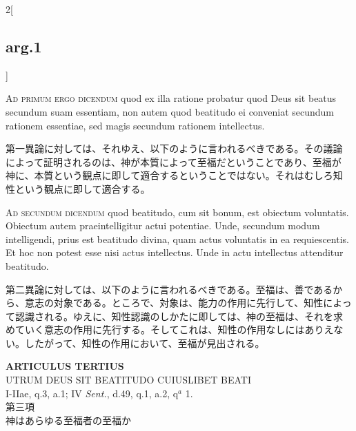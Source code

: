 \documentclass[paper=a4paper,fontsize=10pt,jafontsize=9pt,titlepage]{jlreq}
\begin{document}
\begin{paracol}{2}[\subsection{arg.1}]
\switchcolumn*[\subsection{ad.1}]

{\scshape Ad primum ergo dicendum} quod ex illa ratione probatur quod Deus sit
beatus secundum suam essentiam, non autem quod beatitudo ei conveniat
secundum rationem essentiae, sed magis secundum rationem intellectus.

\switchcolumn

第一異論に対しては、それゆえ、以下のように言われるべきである。その議論
によって証明されるのは、神が本質によって至福だということであり、至福が
神に、本質という観点に即して適合するということではない。それはむしろ知
性という観点に即して適合する。

\switchcolumn*[\subsection{ad.2}]

{\scshape Ad secundum dicendum} quod beatitudo, cum sit bonum, est
obiectum voluntatis. Obiectum autem praeintelligitur actui
potentiae. Unde, secundum modum intelligendi, prius est beatitudo
divina, quam actus voluntatis in ea requiescentis. Et hoc non potest
esse nisi actus intellectus. Unde in actu intellectus attenditur
beatitudo.

\switchcolumn

第二異論に対しては、以下のように言われるべきである。至福は、善であるか
ら、意志の対象である。ところで、対象は、能力の作用に先行して、知性によっ
て認識される。ゆえに、知性認識のしかたに即しては、神の至福は、それを求
めていく意志の作用に先行する。そしてこれは、知性の作用なしにはありえな
い。したがって、知性の作用において、至福が見出される。

\end{paracol}



\newpage
{}
{}
\setcounter{section}{3}
\setcounter{subsection}{0}


\begin{center}
 {\Large {\bfseries ARTICULUS TERTIUS}}\\
 {\large UTRUM DEUS SIT BEATITUDO CUIUSLIBET BEATI}\\
 {\footnotesize I-IIae, q.3, a.1; IV {\itshape Sent.}, d.49, q.1, a.2,
 q$^a$ 1.}\\
 {\Large 第三項\\神はあらゆる至福者の至福か}
\end{center}
\end{document}
